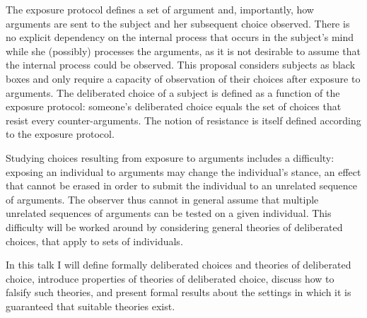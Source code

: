 \documentclass[version=last, pagesize, twoside=off, bibliography=totoc, DIV=calc, fontsize=12pt, a4paper, french, english]{scrartcl}
\begin{document}
The exposure protocol defines a set of argument and, importantly, how arguments are sent to the subject and her subsequent choice observed. There is no explicit dependency on the internal process that occurs in the subject’s mind while she (possibly) processes the arguments, as it is not desirable to assume that the internal process could be observed. This proposal considers subjects as black boxes and only require a capacity of observation of their choices after exposure to arguments.
The deliberated choice of a subject is defined as a function of the exposure protocol: someone’s deliberated choice equals the set of choices that resist every counter-arguments. The notion of resistance is itself defined according to the exposure protocol.

Studying choices resulting from exposure to arguments includes a difficulty: exposing an individual to arguments may change the individual’s stance, an effect that cannot be erased in order to submit the individual to an unrelated sequence of arguments. The observer thus cannot in general assume that multiple unrelated sequences of arguments can be tested on a given individual. This difficulty will be worked around by considering general theories of deliberated choices, that apply to sets of individuals. 

In this talk I will define formally deliberated choices and theories of deliberated choice, introduce properties of theories of deliberated choice, discuss how to falsify such theories, and present formal results about the settings in which it is guaranteed that suitable theories exist.


\end{document}
